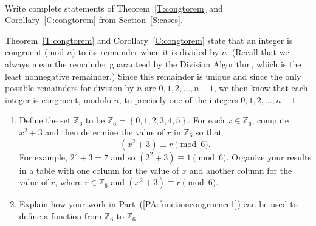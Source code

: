 \begin{previewactivity} \label{PA:functioncongruence} \hfill \\
Write complete statements of Theorem~\ref{T:congtorem}  and  Corollary~\ref{C:congtorem}   from Section~\ref{S:cases}.

Theorem~\ref{T:congtorem} and Corollary~\ref{C:congtorem} state that an integer is congruent (mod $n$) to its remainder when it is divided by  $n$.  (Recall that we always mean the remainder guaranteed by the Division Algorithm, which is the least nonnegative remainder.)  Since this remainder is unique and since the only possible remainders for division by $n$  are  $0, 1, 2,  \ldots , n - 1$, we then know that each integer is congruent, modulo $n$, to precisely one of the integers $0,1,2, \ldots ,n - 1$.
%
\begin{enumerate}
\item Define the set  $\mathbb{Z}_6 $ to be  $\mathbb{Z}_6  = \left\{ {0, 1, 2, 3, 4, 5} \right\}$.  For each  $x \in \mathbb{Z}_6 $, compute  $x^2  + 3$ and then determine the value of  $r$  in  $\mathbb{Z}_6 $ so that
\[
\left( {x^2  + 3} \right) \equiv r\pmod 6.
\]
For example,  $2^2  + 3 = 7$ and so  $\left( {2^2  + 3} \right) \equiv 1 \pmod 6$.  Organize your results in a table with one column for the value of $x$ and another column for the value of $r$, where $r \in \mathbb{Z}_6$ and $\left( {x^2  + 3} \right) \equiv r\pmod 6$. 
\label{PA:functioncongruence1}

\item Explain how your work in Part~(\ref{PA:functioncongruence1}) can be used to define a function from   $\mathbb{Z}_6 $
to  $\mathbb{Z}_6 $.

\end{enumerate}
\end{previewactivity}
\hbreak
%
%

